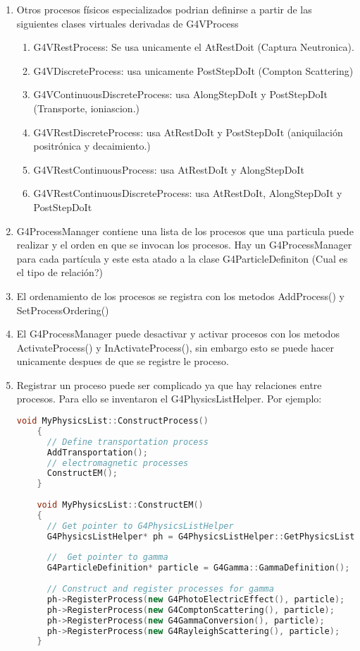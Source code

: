 \documentclass[10pt,a4paper,oneside]{book}
\begin{document}
\begin{enumerate}
\item Otros procesos físicos especializados podrian definirse a partir
  de las siguientes clases virtuales derivadas de G4VProcess
  \begin{enumerate}
  \item G4VRestProcess: Se usa unicamente el AtRestDoit (Captura
    Neutronica).
  \item G4VDiscreteProcess: usa unicamente PostStepDoIt (Compton Scattering)
  \item G4VContinuousDiscreteProcess: usa AlongStepDoIt y PostStepDoIt
    (Transporte, ioniascion.)
  \item G4VRestDiscreteProcess: usa AtRestDoIt y PostStepDoIt
    (aniquilación positrónica y decaimiento.)
  \item G4VRestContinuousProcess: usa AtRestDoIt y AlongStepDoIt
  \item G4VRestContinuousDiscreteProcess: usa AtRestDoIt,
    AlongStepDoIt y PostStepDoIt
  \end{enumerate}

\item G4ProcessManager contiene una lista de los procesos que una
  particula puede realizar y el orden en que se invocan los procesos. Hay
  un G4ProcessManager para cada partícula y este esta atado a la clase
  G4ParticleDefiniton (Cual es el tipo de relación?)
\item El ordenamiento de los procesos se registra con los metodos
  AddProcess() y SetProcessOrdering()
\item El G4ProcessManager puede desactivar y activar procesos con los
  metodos ActivateProcess() y InActivateProcess(), sin embargo esto se
  puede hacer unicamente despues de que se registre le proceso.
\item Registrar un proceso puede ser complicado ya que hay relaciones
  entre procesos. Para ello se inventaron el G4PhysicsListHelper. Por
  ejemplo:
  \begin{lstlisting}[language=C++, frame = single]
    void MyPhysicsList::ConstructProcess()
    {
      // Define transportation process
      AddTransportation();
      // electromagnetic processes
      ConstructEM();
    }
    
    void MyPhysicsList::ConstructEM()
    {
      // Get pointer to G4PhysicsListHelper
      G4PhysicsListHelper* ph = G4PhysicsListHelper::GetPhysicsListHelper();
      
      //  Get pointer to gamma
      G4ParticleDefinition* particle = G4Gamma::GammaDefinition(); 
      
      // Construct and register processes for gamma 
      ph->RegisterProcess(new G4PhotoElectricEffect(), particle);
      ph->RegisterProcess(new G4ComptonScattering(), particle);
      ph->RegisterProcess(new G4GammaConversion(), particle);
      ph->RegisterProcess(new G4RayleighScattering(), particle);
    }  
  \end{lstlisting}
\end{enumerate}
\end{document}
